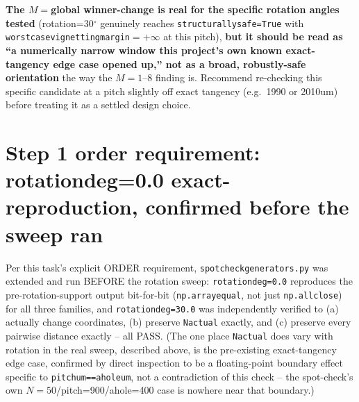 \documentclass[11pt]{article}
\renewcommand{\_}{\origunderscore\penalty0\hskip0pt\relax}
\begin{document}
\textbf{The $M=$global winner-change is real for the specific rotation angles
tested} (rotation=30$^\circ$ genuinely reaches \texttt{structurally\_safe=True}
with \texttt{worst\_case\_vignetting\_margin}$=+\infty$ at this pitch),
\textbf{but it should be read as ``a numerically narrow window this project's
own known exact-tangency edge case opened up,'' not as a broad, robustly-safe
orientation} the way the $M=1$--8 finding is. Recommend re-checking this
specific candidate at a pitch slightly off exact tangency (e.g.\ 1990 or
2010um) before treating it as a settled design choice.

\section{Step 1 order requirement: rotation\_deg=0.0 exact-reproduction, confirmed before the sweep ran}
\label{sec:order}
Per this task's explicit ORDER requirement, \texttt{spot\_check\_generators.py}
was extended and run BEFORE the rotation sweep: \texttt{rotation\_deg=0.0}
reproduces the pre-rotation-support output bit-for-bit (\texttt{np.array\_equal},
not just \texttt{np.allclose}) for all three families, and
\texttt{rotation\_deg=30.0} was independently verified to (a) actually change
coordinates, (b) preserve \texttt{N\_actual} exactly, and (c) preserve every
pairwise distance exactly -- all PASS. (The one place \texttt{N\_actual} does
vary with rotation in the real sweep, described above, is the pre-existing
exact-tangency edge case, confirmed by direct inspection to be a
floating-point boundary effect specific to \texttt{pitch\_um==a\_hole\_um}, not
a contradiction of this check -- the spot-check's own $N=50$/pitch=900/a\_hole=400
case is nowhere near that boundary.)
\end{document}
